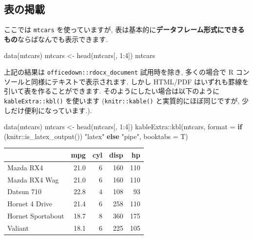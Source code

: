 \documentclass[
]{ltjsarticle}
\newenvironment{Shaded}{\begin{snugshade}}{\end{snugshade}}
\newcommand{\AttributeTok}[1]{\textcolor[rgb]{0.77,0.63,0.00}{#1}}
\newcommand{\ControlFlowTok}[1]{\textcolor[rgb]{0.13,0.29,0.53}{\textbf{#1}}}
\newcommand{\DecValTok}[1]{\textcolor[rgb]{0.00,0.00,0.81}{#1}}
\newcommand{\FunctionTok}[1]{\textcolor[rgb]{0.00,0.00,0.00}{#1}}
\newcommand{\NormalTok}[1]{#1}
\newcommand{\OtherTok}[1]{\textcolor[rgb]{0.56,0.35,0.01}{#1}}
\newcommand{\SpecialCharTok}[1]{\textcolor[rgb]{0.00,0.00,0.00}{#1}}
\newcommand{\StringTok}[1]{\textcolor[rgb]{0.31,0.60,0.02}{#1}}
\begin{document}
\hypertarget{ux8868ux306eux63b2ux8f09}{%
\subsection{表の掲載}\label{ux8868ux306eux63b2ux8f09}}

ここでは \texttt{mtcars} を使っていますが, 表は基本的に\textbf{データフレーム形式にできるもの}ならばなんでも表示できます.

\begin{Shaded}
\begin{Highlighting}[numbers=left,,]
\FunctionTok{data}\NormalTok{(mtcars)}
\NormalTok{mtcars }\OtherTok{\textless{}{-}} \FunctionTok{head}\NormalTok{(mtcars[, }\DecValTok{1}\SpecialCharTok{:}\DecValTok{4}\NormalTok{])}
\NormalTok{mtcars}
\end{Highlighting}
\end{Shaded}

上記の結果は \texttt{officedown::rdocx\_document} 試用時を除き, 多くの場合で R コンソールと同様にテキストで表示されます. しかし HTML/PDF はいずれも罫線を引いて表を作ることができます. そのようにしたい場合は以下のように \texttt{kableExtra::kbl()} を使います (\texttt{knitr::kable()} と実質的にほぼ同じですが, 少しだけ便利になっています.).

\begin{Shaded}
\begin{Highlighting}[numbers=left,,]
\FunctionTok{data}\NormalTok{(mtcars)}
\NormalTok{mtcars }\OtherTok{\textless{}{-}} \FunctionTok{head}\NormalTok{(mtcars[, }\DecValTok{1}\SpecialCharTok{:}\DecValTok{4}\NormalTok{])}
\NormalTok{kableExtra}\SpecialCharTok{::}\FunctionTok{kbl}\NormalTok{(mtcars, }\AttributeTok{format =} \ControlFlowTok{if}\NormalTok{ (knitr}\SpecialCharTok{::}\FunctionTok{is\_latex\_output}\NormalTok{()) }\StringTok{"latex"} \ControlFlowTok{else} \StringTok{"pipe"}\NormalTok{, }\AttributeTok{booktabs =}\NormalTok{ T)}
\end{Highlighting}
\end{Shaded}

\begin{tabular}{lrrrr}
\toprule
  & mpg & cyl & disp & hp\\
\midrule
Mazda RX4 & 21.0 & 6 & 160 & 110\\
Mazda RX4 Wag & 21.0 & 6 & 160 & 110\\
Datsun 710 & 22.8 & 4 & 108 & 93\\
Hornet 4 Drive & 21.4 & 6 & 258 & 110\\
Hornet Sportabout & 18.7 & 8 & 360 & 175\\
\addlinespace
Valiant & 18.1 & 6 & 225 & 105\\
\bottomrule
\end{tabular}
\end{document}
